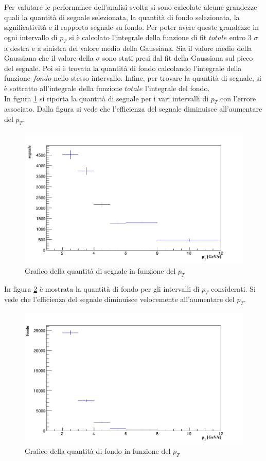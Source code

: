 Per valutare le performance dell'analisi svolta si sono calcolate alcune grandezze quali la quantità di segnale selezionata, la quantità di fondo selezionata, la significatività e il rapporto segnale su fondo. Per poter avere queste grandezze in ogni intervallo di $p_T$ si è calcolato l'integrale della funzione di fit $totale$ entro 3 $\sigma$ a destra e a sinistra del valore medio della Gaussiana. Sia il valore medio della Gaussiana che il valore della $\sigma$ sono stati presi dal fit della Gaussiana sul picco del segnale. Poi si è trovata la quantità di fondo calcolando l'integrale della funzione $fondo$ nello stesso intervallo. Infine, per trovare la quantità di segnale, si è sottratto all'integrale della funzione $totale$ l'integrale del fondo. 
\\In figura \ref{fig:segnale} si riporta la quantità di segnale per i vari intervalli di $p_T$ con l'errore associato. Dalla figura si vede che l'efficienza del segnale diminuisce all'aumentare del $p_T$.

    \begin{figure}[htbp] 
        \centering
        \includegraphics[width=0.9\linewidth]{AnalisiDati/segnale.png}
        \caption{Grafico della quantità di segnale in funzione del $p_T$}
        \label{fig:segnale}
    \end{figure}

In figura \ref{fig:fondo} è mostrata la quantità di fondo per gli intervalli di $p_T$ considerati. Si vede che l'efficienza del segnale diminuisce velocemente all'aumentare del $p_T$.

    \begin{figure}[htbp] 
        \centering
        \includegraphics[width=0.9\linewidth]{AnalisiDati/fondo.png}
        \caption{Grafico della quantità di fondo in funzione del $p_T$}
        \label{fig:fondo}
    \end{figure}
    

